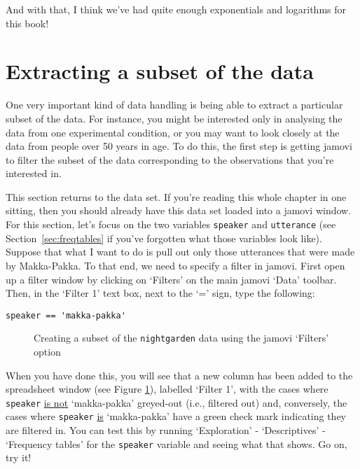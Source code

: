 And with that, I think we've had quite enough exponentials and logarithms for this book!



\section{Extracting a subset of the data~\label{sec:subset}}

One very important kind of data handling is being able to extract a particular subset of the data. For instance, you might be interested only in analysing the data from one experimental condition, or you may want to look closely at the data from people over 50 years in age. To do this, the first step is getting jamovi to filter the subset of the data corresponding to the observations that you're interested in. 

This section returns to the  data set. If you're reading this whole chapter in one sitting, then you should already have this data set loaded into a jamovi window. For this section, let's focus on the two variables \texttt{speaker} and \texttt{utterance} (see Section~\ref{sec:freqtables} if you've forgotten what those variables look like). Suppose that what I want to do is pull out only those utterances that were made by Makka-Pakka. To that end, we need to specify a filter in jamovi. First open up a filter window by clicking on `Filters' on the main jamovi `Data' toolbar. Then, in the `Filter 1' text box, next to the `=' sign, type the following:
\begin{verbatim}
speaker == 'makka-pakka'
\end{verbatim}

\begin{figure}[htb!!]
\begin{center}
\caption{Creating a subset of the \texttt{nightgarden} data using the jamovi `Filters' option}
\label{fig:subset1}
\end{center}
\end{figure}

When you have done this, you will see that a new column has been added to the spreadsheet window (see Figure \ref{fig:subset1}), labelled `Filter 1', with the cases where \texttt{speaker} \underline{is not} `makka-pakka' greyed-out (i.e., filtered out) and, conversely, the cases where \texttt{speaker} \underline{is} `makka-pakka' have a green check mark indicating they are filtered in. You can test this by running `Exploration' - `Descriptives' - `Frequency tables' for the \texttt{speaker} variable and seeing what that shows. Go on, try it!


